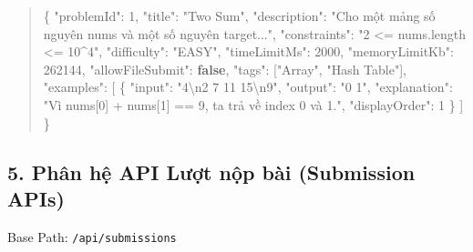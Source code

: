 \documentclass[12pt,a4paper]{article}
\renewcommand{\_}{\BreakableUnderscore}
\newenvironment{Shaded}{\vspace{3pt}\begin{quote}}{\end{quote}\vspace{3pt}}
\newcommand{\CharTok}[1]{\textcolor[rgb]{0.25,0.44,0.63}{#1}}
\newcommand{\DataTypeTok}[1]{\textcolor[rgb]{0.56,0.13,0.00}{#1}}
\newcommand{\DecValTok}[1]{\textcolor[rgb]{0.25,0.63,0.44}{#1}}
\newcommand{\FunctionTok}[1]{\textcolor[rgb]{0.02,0.16,0.49}{#1}}
\newcommand{\KeywordTok}[1]{\textcolor[rgb]{0.00,0.44,0.13}{\textbf{#1}}}
\newcommand{\OtherTok}[1]{\textcolor[rgb]{0.00,0.44,0.13}{#1}}
\newcommand{\StringTok}[1]{\textcolor[rgb]{0.25,0.44,0.63}{#1}}
\begin{document}
\begin{Shaded}
\begin{Highlighting}[]
\FunctionTok{\{}
  \DataTypeTok{"problemId"}\FunctionTok{:} \DecValTok{1}\FunctionTok{,}
  \DataTypeTok{"title"}\FunctionTok{:} \StringTok{"Two Sum"}\FunctionTok{,}
  \DataTypeTok{"description"}\FunctionTok{:} \StringTok{"Cho một mảng số nguyên \textasciigrave{}nums\textasciigrave{} và một số nguyên \textasciigrave{}target\textasciigrave{}..."}\FunctionTok{,}
  \DataTypeTok{"constraints"}\FunctionTok{:} \StringTok{"2 \textless{}= nums.length \textless{}= 10\^{}4"}\FunctionTok{,}
  \DataTypeTok{"difficulty"}\FunctionTok{:} \StringTok{"EASY"}\FunctionTok{,}
  \DataTypeTok{"timeLimitMs"}\FunctionTok{:} \DecValTok{2000}\FunctionTok{,}
  \DataTypeTok{"memoryLimitKb"}\FunctionTok{:} \DecValTok{262144}\FunctionTok{,}
  \DataTypeTok{"allowFileSubmit"}\FunctionTok{:} \KeywordTok{false}\FunctionTok{,}
  \DataTypeTok{"tags"}\FunctionTok{:} \OtherTok{[}\StringTok{"Array"}\OtherTok{,} \StringTok{"Hash Table"}\OtherTok{]}\FunctionTok{,}
  \DataTypeTok{"examples"}\FunctionTok{:} \OtherTok{[}
    \FunctionTok{\{}
      \DataTypeTok{"input"}\FunctionTok{:} \StringTok{"4}\CharTok{\textbackslash{}n}\StringTok{2 7 11 15}\CharTok{\textbackslash{}n}\StringTok{9"}\FunctionTok{,}
      \DataTypeTok{"output"}\FunctionTok{:} \StringTok{"0 1"}\FunctionTok{,}
      \DataTypeTok{"explanation"}\FunctionTok{:} \StringTok{"Vì nums[0] + nums[1] == 9, ta trả về index 0 và 1."}\FunctionTok{,}
      \DataTypeTok{"displayOrder"}\FunctionTok{:} \DecValTok{1}
    \FunctionTok{\}}
  \OtherTok{]}
\FunctionTok{\}}
\end{Highlighting}
\end{Shaded}

\subsection{5. Phân hệ API Lượt nộp bài (Submission APIs)}

Base Path: \texttt{/api/submissions}
\end{document}
